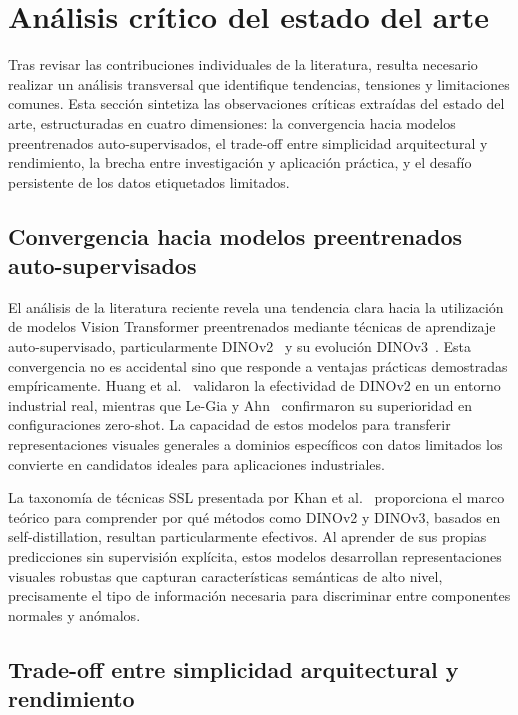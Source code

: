 \section{Análisis crítico del estado del arte}

Tras revisar las contribuciones individuales de la literatura, resulta necesario realizar un análisis transversal que identifique tendencias, tensiones y limitaciones comunes. Esta sección sintetiza las observaciones críticas extraídas del estado del arte, estructuradas en cuatro dimensiones: la convergencia hacia modelos preentrenados auto-supervisados, el trade-off entre simplicidad arquitectural y rendimiento, la brecha entre investigación y aplicación práctica, y el desafío persistente de los datos etiquetados limitados.

\subsection{Convergencia hacia modelos preentrenados auto-supervisados}

El análisis de la literatura reciente revela una tendencia clara hacia la utilización de modelos Vision Transformer preentrenados mediante técnicas de aprendizaje auto-supervisado, particularmente DINOv2~\cite{oquab2024dinov2} y su evolución DINOv3~\cite{simeoni2025dinov3}. Esta convergencia no es accidental sino que responde a ventajas prácticas demostradas empíricamente. Huang et al.~\cite{huang2025semiconductor} validaron la efectividad de DINOv2 en un entorno industrial real, mientras que Le-Gia y Ahn~\cite{legia2025consistent} confirmaron su superioridad en configuraciones zero-shot. La capacidad de estos modelos para transferir representaciones visuales generales a dominios específicos con datos limitados los convierte en candidatos ideales para aplicaciones industriales.

La taxonomía de técnicas SSL presentada por Khan et al.~\cite{khan2024survey} proporciona el marco teórico para comprender por qué métodos como DINOv2 y DINOv3, basados en self-distillation, resultan particularmente efectivos. Al aprender de sus propias predicciones sin supervisión explícita, estos modelos desarrollan representaciones visuales robustas que capturan características semánticas de alto nivel, precisamente el tipo de información necesaria para discriminar entre componentes normales y anómalos.

\subsection{Trade-off entre simplicidad arquitectural y rendimiento}

